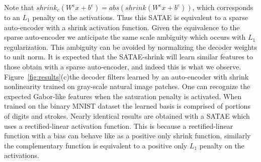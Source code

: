 \documentclass{article} %
\begin{document}
Note that $shrink_c(W^e x + b^e) =  abs(shrink(W^e x + b^e))$, which corresponds to an $L_1$ penalty on the activations. Thus this SATAE is equivalent to a sparse auto-encoder with a shrink activation function. Given the equivalence to the sparse auto-encoder we anticipate the same scale ambiguity which occurs with $L_1$ regularization. This ambiguity can be avoided by normalizing the decoder weights to unit norm. It is expected that the SATAE-shrink will learn similar features to those obtain with a sparse auto-encoder, and indeed this is what we observe. Figure~\ref{fig:results}(c)the decoder filters learned by an auto-encoder with shrink nonlinearity trained on gray-scale natural image patches. One can recognize the expected Gabor-like features when the saturation penalty is activated. When trained on the binary MNIST dataset the learned basis is comprised of portions of digits and strokes. Nearly identical results are obtained with a SATAE which uses a rectified-linear activation function. This is because a rectified-linear function with a bias can behave like as a positive only shrink function, similarly the complementary function is equivalent to a positive only $L_1$ penalty on the activations.          
\end{document}
